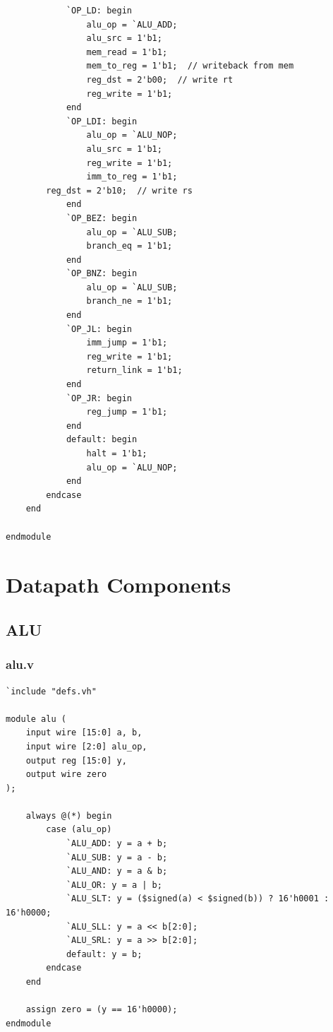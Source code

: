 \documentclass[12pt]{report}
\begin{document}
\begin{lstlisting}
            `OP_LD: begin
                alu_op = `ALU_ADD;
                alu_src = 1'b1;
                mem_read = 1'b1;
                mem_to_reg = 1'b1;  // writeback from mem
                reg_dst = 2'b00;  // write rt
                reg_write = 1'b1;
            end
            `OP_LDI: begin
                alu_op = `ALU_NOP;
                alu_src = 1'b1;
                reg_write = 1'b1;
                imm_to_reg = 1'b1;
		reg_dst = 2'b10;  // write rs
            end
            `OP_BEZ: begin
                alu_op = `ALU_SUB;
                branch_eq = 1'b1;
            end
            `OP_BNZ: begin
                alu_op = `ALU_SUB;
                branch_ne = 1'b1;
            end
            `OP_JL: begin
                imm_jump = 1'b1;
                reg_write = 1'b1;
                return_link = 1'b1;
            end
            `OP_JR: begin
                reg_jump = 1'b1;
            end
            default: begin
                halt = 1'b1;
                alu_op = `ALU_NOP;
            end
        endcase
    end

endmodule
\end{lstlisting}

\section{Datapath Components}

\subsection{ALU}
\subsubsection{alu.v}
\begin{lstlisting}
`include "defs.vh"

module alu (
    input wire [15:0] a, b,
    input wire [2:0] alu_op,
    output reg [15:0] y,
    output wire zero
);

    always @(*) begin
        case (alu_op)
            `ALU_ADD: y = a + b;
            `ALU_SUB: y = a - b;
            `ALU_AND: y = a & b;
            `ALU_OR: y = a | b;
            `ALU_SLT: y = ($signed(a) < $signed(b)) ? 16'h0001 : 16'h0000;
            `ALU_SLL: y = a << b[2:0];
            `ALU_SRL: y = a >> b[2:0];
            default: y = b;
        endcase
    end

    assign zero = (y == 16'h0000);
endmodule
\end{lstlisting}
\end{document}
